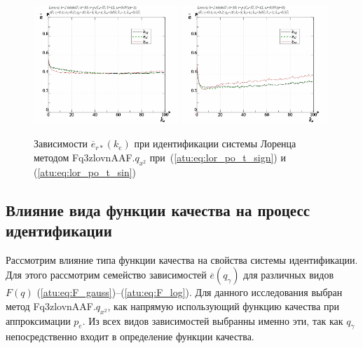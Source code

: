 \begin{figure}[ht!]
  \centerline{
    \includegraphics[width=0.49\textwidth]{p/cha/lor/Fq3zlovnAAF/lor_Fq3zlovnAAF_qx2-p_ke_e_sign.png}
    \hfill
    \includegraphics[width=0.49\textwidth]{p/cha/lor/Fq3zlovnAAF/lor_Fq3zlovnAAF_qx2-p_ke_e_sin.png}
  }
  \caption{Зависимости $\overline{e}_{r*}(k_e)$ при идентификации системы Лоренца методом Fq3zlovnAAF.$q_{x^2}$
   при~(\ref{atu:eq:lor_po_t_sign}) и (\ref{atu:eq:lor_po_t_sin})}
  \label{atu:f:lor_ke_Fq3zlovnAAF.q_x2}
\end{figure}





\subsection{Влияние вида функции качества на процесс идентификации}  %

Рассмотрим влияние типа функции качества на свойства системы идентификации.
Для этого рассмотрим семейство зависимостей
$\overline{e}(q_\gamma)$ для различных видов $F(q)$
(\ref{atu:eq:F_gauss})--(\ref{atu:eq:F_log}).
Для данного исследования выбран метод Fq3zlovnAAF.$q_{x^2}$,
как напрямую использующий функцию качества при
аппроксимации $p_e$.
Из всех видов зависимостей выбранны именно эти,
так как $q_\gamma$ непосредственно входит в определение функции качества.


